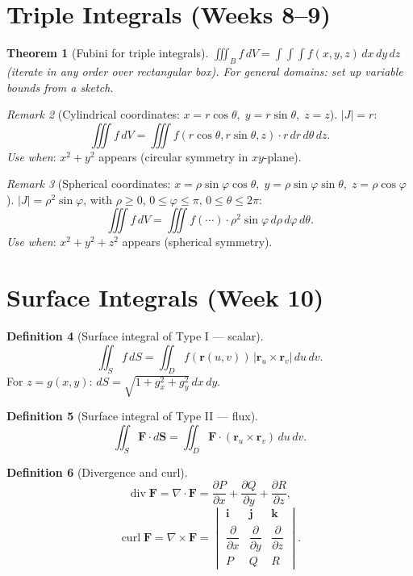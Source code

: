 \documentclass[12pt,a4paper]{article}
\newtheorem{theorem}{Theorem}[section]
\theoremstyle{definition}
\newtheorem{definition}[theorem]{Definition}
\theoremstyle{remark}
\newtheorem{remark}[theorem]{Remark}
\newcommand{\pd}[2]{\dfrac{\partial #1}{\partial #2}}
\begin{document}
\section{Triple Integrals (Weeks 8--9)}

\begin{theorem}[Fubini for triple integrals]
$\iiint_B f\,dV = \int\!\!\int\!\!\int f(x,y,z)\,dx\,dy\,dz$ (iterate in any order over rectangular box).
For general domains: set up variable bounds from a sketch.
\end{theorem}

\begin{remark}[Cylindrical coordinates: $x=r\cos\theta,\;y=r\sin\theta,\;z=z$]
$|J|=r$:
\[
  \iiint f\,dV = \iiint f(r\cos\theta,r\sin\theta,z)\cdot r\,dr\,d\theta\,dz.
\]
\textit{Use when}: $x^2+y^2$ appears (circular symmetry in $xy$-plane).
\end{remark}

\begin{remark}[Spherical coordinates: $x=\rho\sin\varphi\cos\theta,\;y=\rho\sin\varphi\sin\theta,\;z=\rho\cos\varphi$]
$|J|=\rho^2\sin\varphi$, with $\rho\ge 0$, $0\le\varphi\le\pi$, $0\le\theta\le 2\pi$:
\[
  \iiint f\,dV = \iiint f(\cdots)\cdot\rho^2\sin\varphi\,d\rho\,d\varphi\,d\theta.
\]
\textit{Use when}: $x^2+y^2+z^2$ appears (spherical symmetry).
\end{remark}

\section{Surface Integrals (Week 10)}

\begin{definition}[Surface integral of Type I --- scalar]
\[
  \iint_S f\,dS = \iint_D f(\mathbf{r}(u,v))\,|\mathbf{r}_u\times\mathbf{r}_v|\,du\,dv.
\]
For $z=g(x,y)$: $dS=\sqrt{1+g_x^2+g_y^2}\,dx\,dy$.
\end{definition}

\begin{definition}[Surface integral of Type II --- flux]
\[
  \iint_S \mathbf{F}\cdot d\mathbf{S} = \iint_D \mathbf{F}\cdot(\mathbf{r}_u\times\mathbf{r}_v)\,du\,dv.
\]
\end{definition}

\begin{definition}[Divergence and curl]
\[
  \operatorname{div}\mathbf{F} = \nabla\cdot\mathbf{F} = \pd{P}{x}+\pd{Q}{y}+\pd{R}{z},
\]
\[
  \operatorname{curl}\mathbf{F} = \nabla\times\mathbf{F} =
  \begin{vmatrix}\mathbf{i}&\mathbf{j}&\mathbf{k}\\\pd{}{x}&\pd{}{y}&\pd{}{z}\\P&Q&R\end{vmatrix}.
\]
\end{definition}
\end{document}
